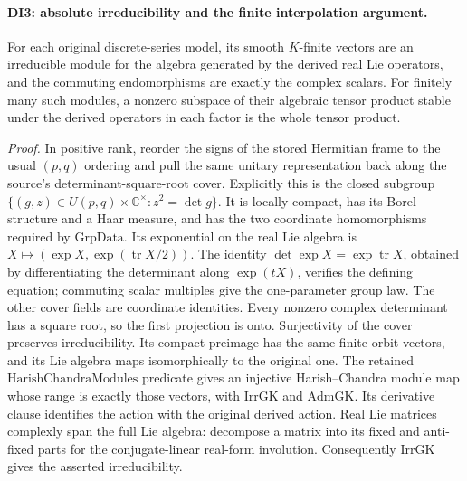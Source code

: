 \paragraph{DI3: absolute irreducibility and the finite interpolation argument.}
\label{claim:DI3}
For each original discrete-series model, its smooth \(K\)-finite
vectors are an irreducible module for the algebra generated by the
derived real Lie operators, and the commuting endomorphisms are
exactly the complex scalars. For finitely many such modules, a nonzero
subspace of their algebraic tensor product stable under the derived
operators in each factor is the whole tensor product.

\emph{Proof.}
In positive rank, reorder the signs of the stored Hermitian frame to
the usual \((p,q)\) ordering and pull the same unitary representation
back along the source's determinant-square-root cover. Explicitly this
is the closed subgroup
\(\{(g,z)\in U(p,q)\times\mathbb C^\times:z^2=\det g\}\).
It is locally compact, has its Borel structure and a Haar measure,
and has the two coordinate homomorphisms required by
\(\mathrm{GrpData}\). Its exponential on the real Lie algebra is
\(X\mapsto(\exp X,\exp(\operatorname{tr}X/2))\).
The identity \(\det\exp X=\exp\operatorname{tr}X\), obtained
by differentiating the determinant along \(\exp(tX)\), verifies
the defining equation; commuting scalar multiples give the
one-parameter group law. The other cover fields are coordinate
identities. Every nonzero complex determinant has a square root,
so the first projection is onto. Surjectivity
of the cover preserves irreducibility. Its compact preimage has the
same finite-orbit vectors, and its Lie algebra maps isomorphically to
the original one. The retained \(\mathrm{HarishChandraModules}\)
predicate gives an injective Harish--Chandra module map whose range
is exactly those vectors, with \(\mathrm{IrrGK}\) and
\(\mathrm{AdmGK}\). Its derivative clause identifies the action
with the original derived action. Real Lie matrices complexly span
the full Lie algebra: decompose a matrix into its fixed and
anti-fixed parts for the conjugate-linear real-form involution.
Consequently \(\mathrm{IrrGK}\) gives the asserted irreducibility.

